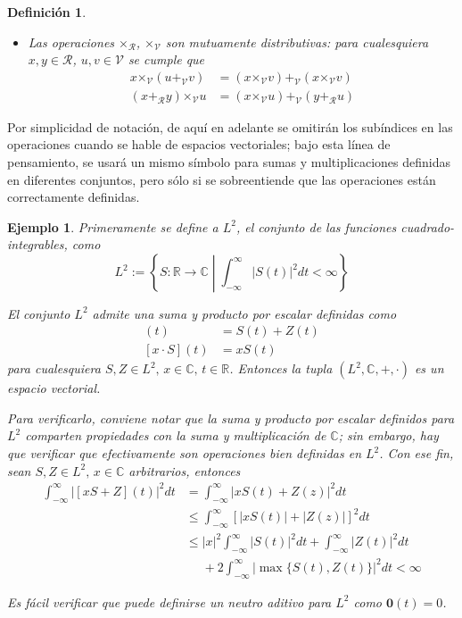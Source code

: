 \documentclass[12pt,letterpaper,draft]{book}
\newtheorem{definicion}{Definición}[chapter]
\newtheorem{ejemplo}{Ejemplo}[chapter]
\newcommand{\R}{\mathbb{R}}
\newcommand{\C}{\mathbb{C}}
\newcommand{\intR}{\int_{-\infty}^{\infty}}
\newcommand{\abso}[1]{\left| #1 \right|}
\newcommand{\talque}{\mathrel{}\middle|\mathrel{}}
\newcommand{\pheq}{\phantom{=}}
\begin{document}
\begin{definicion}
\begin{itemize}
\item Las operaciones $\boldsymbol{\times}_\mathcal{R}$, $\boldsymbol{\times}_\mathcal{V}$ son mutuamente distributivas: para cualesquiera $x, y \in \mathcal{R}$, $u, v \in \mathcal{V}$ se cumple que
\begin{align*}
x \boldsymbol{\times}_\mathcal{V} (u \boldsymbol{+}_\mathcal{V} v) &= (x \boldsymbol{\times}_\mathcal{V} v ) \boldsymbol{+}_\mathcal{V} (x \boldsymbol{\times}_\mathcal{V} v) \\
(x \boldsymbol{+}_\mathcal{R} y) \boldsymbol{\times}_\mathcal{V} u &= (x \boldsymbol{\times}_\mathcal{V} u ) \boldsymbol{+}_\mathcal{V} ( y \boldsymbol{+}_\mathcal{R} u)
\end{align*}
\end{itemize}
\end{definicion}

Por simplicidad de notación, de aquí en adelante se omitirán los subíndices en las operaciones cuando se hable de espacios vectoriales;
bajo esta línea de pensamiento, se usará un mismo símbolo para sumas y multiplicaciones definidas en diferentes conjuntos, pero sólo si se sobreentiende que las operaciones están correctamente definidas.

\begin{ejemplo}
Primeramente se define a $L^2$, el conjunto de las funciones cuadrado-integrables, como
\begin{equation}
L^2 := \left\{ S: \R\rightarrow\C \talque \intR \abso{S(t)}^2 dt < \infty \right\}
\end{equation}

El conjunto $L^2$ admite una suma y producto por escalar definidas como
\begin{align}
[S+Z](t) &= S(t) + Z(t) \\
[x\cdot S](t) &= x S(t)
\end{align}
para cualesquiera $S, Z \in L^{2}, \, x\in \C, \, t\in \R$. 
%
Entonces la tupla $(L^{2}, \C,+,\cdot)$ es un espacio vectorial.

Para verificarlo, conviene notar que la suma y producto por escalar definidos para $L^{2}$ comparten propiedades con la suma y multiplicación de $\C$; sin embargo, hay que verificar que efectivamente son operaciones bien definidas en $L^{2}$.
%
Con ese fin, sean $S, Z \in L^{2}, \, x \in \C$ arbitrarios, entonces
\begin{align*}
\intR \abso{\left[x S + Z\right]\left(t\right)}^2 dt 
&= 
\intR \abso{ xS(t) + Z(z)}^2 dt \\
&\leq
\intR \left[ \abso{ xS(t)} + \abso{ Z(z)} \right]^2 dt \\
&\leq
\abso{x}^{2} \intR \abso{ S(t)}^{2} dt + \intR \abso{ Z(t)}^{2} dt \\
&\pheq
+ 2\intR \abso{ \max\{ S(t), Z(t) \} }^{2} dt < \infty
\end{align*}

Es fácil verificar que puede definirse un neutro aditivo para $L^{2}$ como $\boldsymbol{0}(t) = 0$.
\end{ejemplo}
\end{document}
